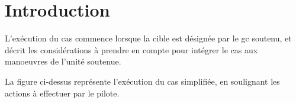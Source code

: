 \section{Introduction}

L'exécution du \gls{cas} commence lorsque la cible est désignée par le \gls{gc} soutenu, et décrit les considérations à prendre en compte pour intégrer le \gls{cas} aux manoeuvres de l'unité soutenue.


La figure ci-dessus représente l'exécution du \gls{cas} simplifiée, en soulignant les actions à effectuer par le pilote.

